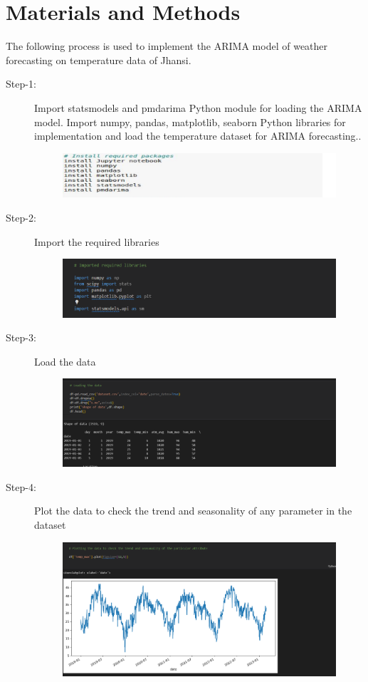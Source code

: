  \section {Materials and Methods}
The following process is used to implement the ARIMA model of weather forecasting on temperature data of Jhansi.
 \begin{description}
\item[Step-1:] Import statsmodels and pmdarima Python module for loading the ARIMA model. Import numpy, pandas, matplotlib, seaborn Python libraries for implementation and load the temperature dataset for ARIMA forecasting..
\begin{figure}[hbt!]
  \centering
  \includegraphics[width=0.8\linewidth]{images/outputs/1.png}
\end{figure}
\item[Step-2:] Import the required libraries
 \begin{figure}[hbt!]
  \centering
 \includegraphics[width=0.8\linewidth]{images/outputs/2.png}
\end{figure}
\item[Step-3:] Load the data
 \begin{figure}[hbt!]
  \centering
  \includegraphics[width=0.8\linewidth]{images/outputs/3.png}
\end{figure}
\FloatBarrier
\pagebreak
\item[Step-4:] Plot the data to check the trend and seasonality of any parameter in the dataset

 \begin{figure}[hbt!]
  \centering
  \includegraphics[width=0.7\linewidth]{images/outputs/4.png}
\end{figure}


\end{description}
